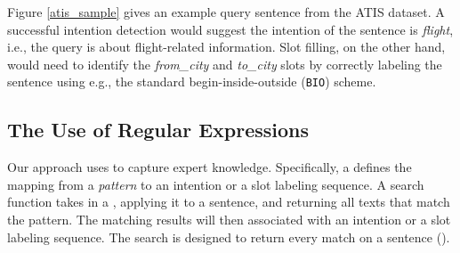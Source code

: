 
 Figure \ref{atis_sample} gives an example query sentence from the ATIS dataset\todo{\cite{}}. A successful intention
detection would suggest the intention of the sentence is \emph{flight}, i.e., the query is about flight-related information. Slot filling,
on the other hand, would need to identify the \emph{from\_city} and \emph{to\_city} slots by correctly labeling the sentence using e.g.,
the standard begin-inside-outside (\texttt{BIO}) scheme.




%


\subsection{The Use of Regular Expressions}
\label{re_desc}

Our approach uses \REs to capture expert knowledge. Specifically, a \RE defines the mapping from a \emph{pattern} to an intention or a slot
labeling sequence. A search function takes in a \RE, applying it to a sentence, and returning all texts that match the pattern. The
matching results will then associated with an intention or a slot labeling sequence. The search is designed to return every match on a
sentence ().


